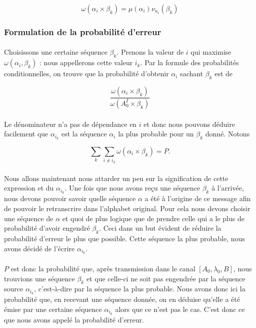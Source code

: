 	\[\omega(\alpha_i\times\beta_k)=\mu(\alpha_i)\nu_{u_i}(\beta_k)\]
	
\subsubsection*{Formulation de la probabilité d'erreur}
	
	\paragraph{}
	Choisissons une certaine séquence $\beta_k$.
	Prenons la valeur de $i$ qui maximise $\omega(\alpha_i,\beta_k)$ : nous 
	appellerons cette valeur $i_k$. Par la formule des
	probabilités conditionnelles, on trouve que la probabilité d'obtenir
	$\alpha_i$ sachant $\beta_k$ est de 
	
	\[\frac{\omega(\alpha_i \times \beta_k)}{\omega(A_0^I \times \beta_k)}\]
	
	\paragraph{}
	Le dénominateur n'a pas de dépendance en $i$ et donc nous pouvons déduire 
	facilement que $\alpha_{i_k}$ est la séquence $\alpha_i$ la plus probable 
	pour un $\beta_k$ donné. Notons
	
	\[\sum_k\sum_{i\neq i_k}\omega(\alpha_i \times \beta_k) = P.\]
	
	\paragraph{}
	Nous allons maintenant nous attarder un peu sur la signification de cette 
	expression et du $\alpha_{i_k}$. Une fois que nous avons reçu une séquence
	$\beta_k$ à l'arrivée, nous devons pouvoir savoir quelle séquence $\alpha$ 
	a été à l'origine de ce message afin de pouvoir le retranscrire dans 
	l'alphabet original. Pour cela nous devons choisir une séquence de $\alpha$
	et quoi de plus logique que de prendre celle qui a le plus de probabilité 
	d'avoir engendré $\beta_k$. Ceci dans un but évident de réduire la 
	probabilité d'erreur le plus que possible. Cette séquence la plus probable,
	nous avons décidé de l'écrire $\alpha_{i_k}$.
	
	\paragraph{}
	$P$ est donc la probabilité que, après transmission dans le canal 
	$[A_0,\lambda_0,B]$, nous trouvions une séquence $\beta_k$ et que
	celle-ci ne soit pas engendrée par la séquence source $\alpha_{i_k}$,
	c'est-à-dire par la séquence la plus probable. Nous avons donc ici la
	probabilité que, en recevant une séquence donnée, on en déduise
	qu'elle a été émise par une certaine séquence $\alpha_{i_k}$ alors
	que ce n'est pas le cas. C'est donc ce que nous avons appelé la 
	probabilité d'erreur.
	
